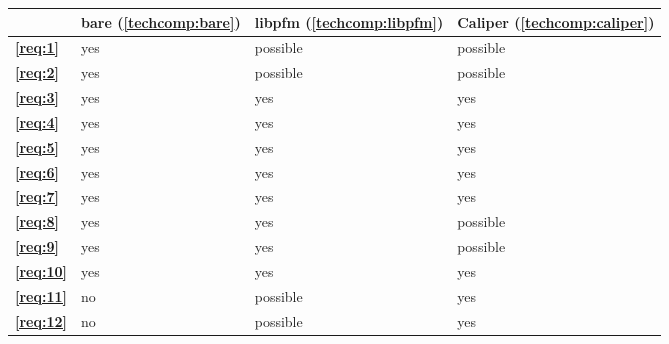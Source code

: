 \begin{table}[!ht]
    \centering
    \begin{tabular}{|l|lll|}
        \cline{2-4}
        \multicolumn{1}{c|}{} & \textbf{bare (\ref{techcomp:bare})} & \textbf{libpfm (\ref{techcomp:libpfm})} & \textbf{Caliper (\ref{techcomp:caliper})} \\
        \hline
        \textbf{\ref{req:1}}  & yes                                 & possible                                & possible                                  \\
        \textbf{\ref{req:2}}  & yes                                 & possible                                & possible                                  \\
        \textbf{\ref{req:3}}  & yes                                 & yes                                     & yes                                       \\
        \textbf{\ref{req:4}}  & yes                                 & yes                                     & yes                                       \\
        \textbf{\ref{req:5}}  & yes                                 & yes                                     & yes                                       \\
        \textbf{\ref{req:6}}  & yes                                 & yes                                     & yes                                       \\
        \textbf{\ref{req:7}}  & yes                                 & yes                                     & yes                                       \\
        \textbf{\ref{req:8}}  & yes                                 & yes                                     & possible                                  \\
        \textbf{\ref{req:9}}  & yes                                 & yes                                     & possible                                  \\
        \textbf{\ref{req:10}} & yes                                 & yes                                     & yes                                       \\
        \textbf{\ref{req:11}} & no                                  & possible                                & yes                                       \\
        \textbf{\ref{req:12}} & no                                  & possible                                & yes                                       \\

\end{tabular}
\end{table}

